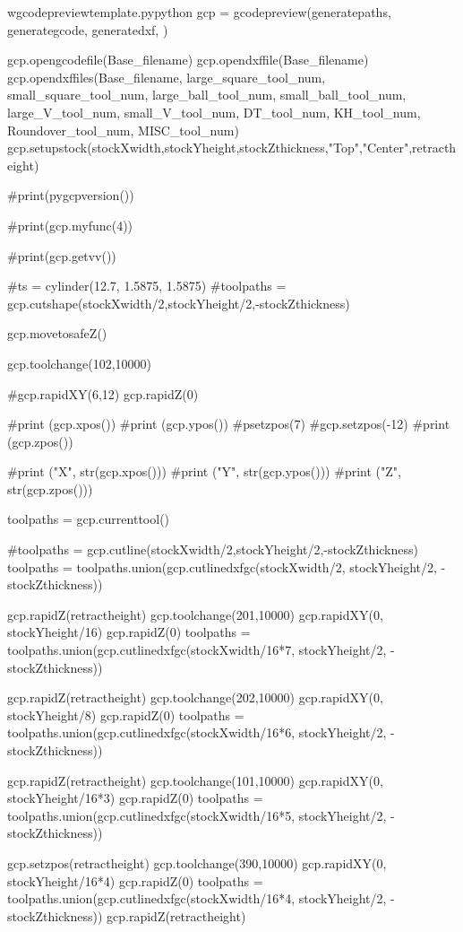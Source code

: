 \documentclass{ltxdoc}
\begin{document}
\begin{writecode}{w}{gcodepreviewtemplate.py}{python}
gcp = gcodepreview(generatepaths,
                   generategcode,
                   generatedxf,
                   )

gcp.opengcodefile(Base_filename)
gcp.opendxffile(Base_filename)
gcp.opendxffiles(Base_filename,
                 large_square_tool_num, 
                 small_square_tool_num, 
                 large_ball_tool_num,
                 small_ball_tool_num,
                 large_V_tool_num,
                 small_V_tool_num,
                 DT_tool_num,
                 KH_tool_num,
                 Roundover_tool_num,
                 MISC_tool_num)
gcp.setupstock(stockXwidth,stockYheight,stockZthickness,"Top","Center",retractheight)

#print(pygcpversion())

#print(gcp.myfunc(4))

#print(gcp.getvv())

#ts = cylinder(12.7, 1.5875, 1.5875)
#toolpaths = gcp.cutshape(stockXwidth/2,stockYheight/2,-stockZthickness)

gcp.movetosafeZ()

gcp.toolchange(102,10000)

#gcp.rapidXY(6,12)
gcp.rapidZ(0)

#print (gcp.xpos())
#print (gcp.ypos())
#psetzpos(7)
#gcp.setzpos(-12)
#print (gcp.zpos())

#print ("X", str(gcp.xpos()))
#print ("Y", str(gcp.ypos()))
#print ("Z", str(gcp.zpos()))

toolpaths = gcp.currenttool()

#toolpaths = gcp.cutline(stockXwidth/2,stockYheight/2,-stockZthickness)
toolpaths = toolpaths.union(gcp.cutlinedxfgc(stockXwidth/2, stockYheight/2, -stockZthickness))

gcp.rapidZ(retractheight)
gcp.toolchange(201,10000)
gcp.rapidXY(0, stockYheight/16)
gcp.rapidZ(0)
toolpaths = toolpaths.union(gcp.cutlinedxfgc(stockXwidth/16*7, stockYheight/2, -stockZthickness))

gcp.rapidZ(retractheight)
gcp.toolchange(202,10000)
gcp.rapidXY(0, stockYheight/8)
gcp.rapidZ(0)
toolpaths = toolpaths.union(gcp.cutlinedxfgc(stockXwidth/16*6, stockYheight/2, -stockZthickness))

gcp.rapidZ(retractheight)
gcp.toolchange(101,10000)
gcp.rapidXY(0, stockYheight/16*3)
gcp.rapidZ(0)
toolpaths = toolpaths.union(gcp.cutlinedxfgc(stockXwidth/16*5, stockYheight/2, -stockZthickness))

gcp.setzpos(retractheight)
gcp.toolchange(390,10000)
gcp.rapidXY(0, stockYheight/16*4)
gcp.rapidZ(0)
toolpaths = toolpaths.union(gcp.cutlinedxfgc(stockXwidth/16*4, stockYheight/2, -stockZthickness))
gcp.rapidZ(retractheight)


\end{writecode}
\end{document}
